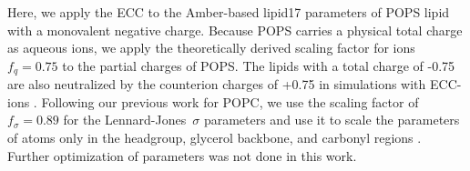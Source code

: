 \documentclass[journal=jpcbfk,manuscript=article]{achemso}
\begin{document}
Here, we apply the ECC to the Amber-based lipid17 parameters \cite{lipid17-future} of POPS lipid with a monovalent negative charge.
Because POPS carries a physical total charge as aqueous ions, we apply the theoretically derived scaling factor for
ions $f_q = 0.75$ \cite{leontyev09} to the partial charges of POPS. 
The lipids with a total charge of -0.75 are also neutralized
by the counterion charges of +0.75 in simulations with ECC-ions \cite{Pluharova2014, kohagen16, martinek17}.
Following our previous work for POPC, we use the scaling factor of $f_\sigma = 0.89$ for the Lennard-Jones~$\sigma$ parameters and
use it to scale the parameters of atoms only in the headgroup, glycerol backbone, and carbonyl regions \cite{melcr18, ECC-POPC_nacl_cacl2_files}.
Further optimization of parameters was not done in this work. 
\end{document}
